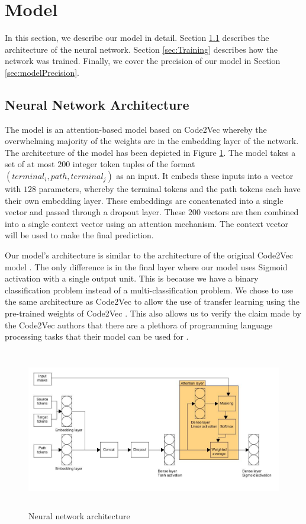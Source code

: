 \section{Model} \label{sec:model}
In this section, we describe our model in detail. Section \ref{sec:NeuralNetworkArchitecture} describes the architecture of the neural network. Section \ref{sec:Training} describes how the network was trained. Finally, we cover the precision of our model in Section \ref{sec:modelPrecision}.

\subsection{Neural Network Architecture}\label{sec:NeuralNetworkArchitecture}
The model is an attention-based model based on Code2Vec \cite{alon2019code2vec} whereby the overwhelming majority of the weights are in the embedding layer of the network. The architecture of the model has been depicted in Figure \ref{fig:networkArchitecture}. The model takes a set of at most $200$ integer token tuples of the format $(terminal_i, path, terminal_j)$ as an input. It embeds these inputs into a vector with $128$ parameters, whereby the terminal tokens and the path tokens each have their own embedding layer. These embeddings are concatenated into a single vector and passed through a dropout layer. These $200$ vectors are then combined  into a single context vector using an attention mechanism. The context vector will be used to make the final prediction. 

Our model's architecture is similar to the architecture of the original Code2Vec model \cite{alon2019code2vec}. The only difference is in the final layer where our model uses Sigmoid activation with a single output unit. This is because we have a binary classification problem instead of a multi-classification problem. We chose to use the same architecture as Code2Vec to allow the use of transfer learning using the pre-trained weights of Code2Vec \cite{alon2019code2vec}. This also allows us to verify the claim made by the Code2Vec authors that there are a plethora of
programming language processing tasks that their model can be used for \cite{alon2019code2vec}.


\begin{figure}[b] 
  \includegraphics[width=\textwidth,height=7cm]{figures/network.jpg}
  \caption{Neural network architecture}
  \label{fig:networkArchitecture}
\end{figure}



